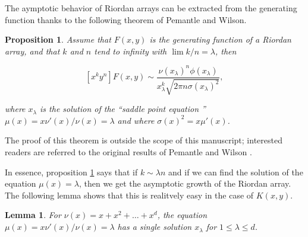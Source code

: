 \documentclass{article}
\newtheorem{lemma}{Lemma}
\newtheorem{proposition}{Proposition}
\begin{document}
The aymptotic behavior of Riordan arrays can be extracted from the
generating function thanks to the following theorem of Pemantle and
Wilson.

\begin{proposition}
\label{th:PW}
Assume that $F(x,y)$ is the generating function of a Riordan array, and
that $k$ and $n$ tend to infinity with $\lim k/n = \lambda$, then

\begin{equation}
\label{eq:assRA}
[x^ky^n]F(x,y) \sim \frac{\nu(x_\lambda)^n\phi(x_\lambda)}
  {x_\lambda^k\sqrt{2\pi n \sigma(x_\lambda)^2}},
\end{equation}

\noindent
where $x_\lambda$ is the solution of the ``saddle point equation ''
$\mu(x) = x\nu'(x)/\nu(x) = \lambda$ and where $\sigma(x)^2 = x \mu'(x)$.
\end{proposition}

The proof of this theorem is outside the scope of this manuscript;
interested readers are referred to the original results of Pemantle and
Wilson \cite{PemWil02,AnalComb2013}.

In essence, proposition \ref{th:PW} says that if $k \sim \lambda n$ and if
we can find the solution of the equation $\mu(x) = \lambda$, then we get
the asymptotic growth of the Riordan array. The following lemma shows that
this is realitvely easy in the case of $K(x,y)$.

\begin{lemma}
\label{th:mu}
For $\nu(x) = x+x^2+\ldots+x^d$, the equation $\mu(x) = x\nu'(x)/\nu(x) =
\lambda$ has a single solution $x_\lambda$ for $1 \leq \lambda \leq d$.
\end{lemma}
\end{document}
